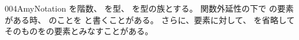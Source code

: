\documentclass[index]{subfiles}
\begin{document}
\begin{myBlock}{004A}{myNotation}
  を階数、
  を型、
  を型の族とする。
  関数外延性の下で
  の要素がある時、
  のことを
  と書くことがある。
  さらに、要素に対して、
  を省略して
  そのものをの要素とみなすことがある。
\end{myBlock}
\end{document}
